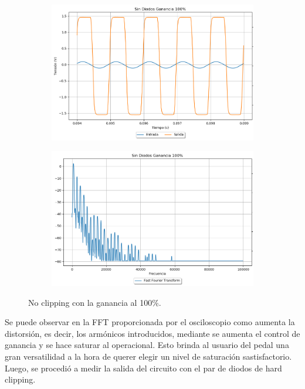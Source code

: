 \begin{figure}[H]
\hspace{-7.5em}
	\begin{subfigure}{0.5\textwidth}
		\includegraphics[width=1.5\textwidth, trim={0 0 0 0}, clip]{Ejercicio5/Imagenes/Propuesto/Mediciones/alone3.png}
		\label{fig:prop_alone3}
	\end{subfigure}
	\hspace{6em}
	\begin{subfigure}{0.5\textwidth}
		\includegraphics[width=1.5\textwidth, trim={0 0 0 0}, clip]{Ejercicio5/Imagenes/Propuesto/Mediciones/alone3fft.png}
		\centering
		\label{fig:prop_alone3fft}
	\end{subfigure}
	\caption{No clipping con la ganancia al 100\%.}
\end{figure}

Se puede observar en la FFT proporcionada por el osciloscopio como aumenta la distorsión, es decir, los armónicos introducidos, mediante se aumenta el control de ganancia y se hace saturar al operacional. Esto brinda al usuario del pedal una gran versatilidad a la hora de querer elegir un nivel de saturación sastisfactorio.
Luego, se procedió a medir la salida del circuito con el par de diodos de hard clipping.

